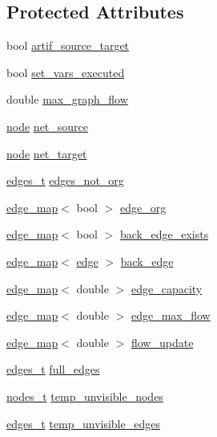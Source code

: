 \subsection*{Protected Attributes}
\begin{DoxyCompactItemize}
\item 
bool \mbox{\hyperlink{classmaxflow__pp_a21263af726420d377e404d816f31ed45}{artif\+\_\+source\+\_\+target}}
\item 
bool \mbox{\hyperlink{classmaxflow__pp_a6642619150b9c12790df2171cfa2c05f}{set\+\_\+vars\+\_\+executed}}
\item 
double \mbox{\hyperlink{classmaxflow__pp_abdda1871e70fd2de0f2006eff57dc94e}{max\+\_\+graph\+\_\+flow}}
\item 
\mbox{\hyperlink{classnode}{node}} \mbox{\hyperlink{classmaxflow__pp_a20f2d05465acc2d7b777ea8025d12003}{net\+\_\+source}}
\item 
\mbox{\hyperlink{classnode}{node}} \mbox{\hyperlink{classmaxflow__pp_a10f0b047011e04cb4816a824da5b7892}{net\+\_\+target}}
\item 
\mbox{\hyperlink{edge_8h_a8f9587479bda6cf612c103494b3858e3}{edges\+\_\+t}} \mbox{\hyperlink{classmaxflow__pp_ad2cae6d52735a83abc830ce518843a31}{edges\+\_\+not\+\_\+org}}
\item 
\mbox{\hyperlink{classedge__map}{edge\+\_\+map}}$<$ bool $>$ \mbox{\hyperlink{classmaxflow__pp_aca9ce457300e11b97cec3446315fda1c}{edge\+\_\+org}}
\item 
\mbox{\hyperlink{classedge__map}{edge\+\_\+map}}$<$ bool $>$ \mbox{\hyperlink{classmaxflow__pp_a50e9c82f1e720b8340ea4dc6d438f110}{back\+\_\+edge\+\_\+exists}}
\item 
\mbox{\hyperlink{classedge__map}{edge\+\_\+map}}$<$ \mbox{\hyperlink{classedge}{edge}} $>$ \mbox{\hyperlink{classmaxflow__pp_a9fdef5a86459eaf9634737094f3de250}{back\+\_\+edge}}
\item 
\mbox{\hyperlink{classedge__map}{edge\+\_\+map}}$<$ double $>$ \mbox{\hyperlink{classmaxflow__pp_af3cdc4999a86322271a80b1855d58629}{edge\+\_\+capacity}}
\item 
\mbox{\hyperlink{classedge__map}{edge\+\_\+map}}$<$ double $>$ \mbox{\hyperlink{classmaxflow__pp_a25d5bb2ab6c775a634dacf408ff55a83}{edge\+\_\+max\+\_\+flow}}
\item 
\mbox{\hyperlink{classedge__map}{edge\+\_\+map}}$<$ double $>$ \mbox{\hyperlink{classmaxflow__pp_ad37aff831935b2cfd4b03bc4a6da06ce}{flow\+\_\+update}}
\item 
\mbox{\hyperlink{edge_8h_a8f9587479bda6cf612c103494b3858e3}{edges\+\_\+t}} \mbox{\hyperlink{classmaxflow__pp_a504adabbe1e7b11a910d6c43a6b71a75}{full\+\_\+edges}}
\item 
\mbox{\hyperlink{edge_8h_a22ac17689106ba21a84e7bc54d1199d6}{nodes\+\_\+t}} \mbox{\hyperlink{classmaxflow__pp_a0510a162f178364f36794e10022cda49}{temp\+\_\+unvisible\+\_\+nodes}}
\item 
\mbox{\hyperlink{edge_8h_a8f9587479bda6cf612c103494b3858e3}{edges\+\_\+t}} \mbox{\hyperlink{classmaxflow__pp_aae17915904c0d17632df70aac9fe88b0}{temp\+\_\+unvisible\+\_\+edges}}
\end{DoxyCompactItemize}


